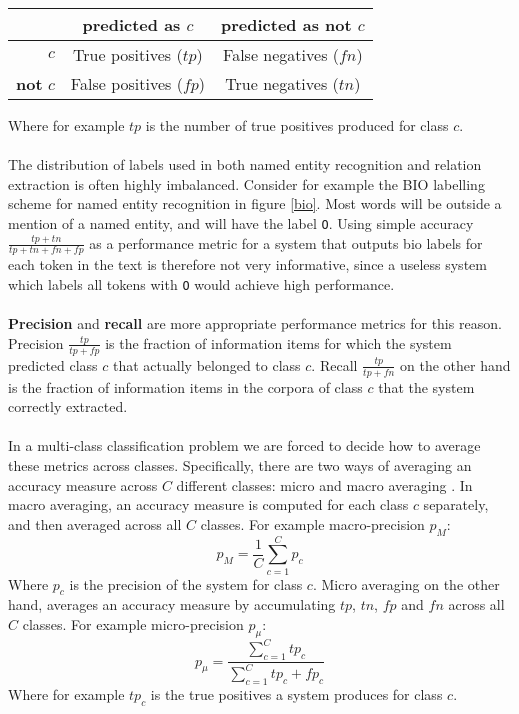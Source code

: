 \begin{center}
	\begin{tabular}{r | c c}
	 & \textbf{predicted as $c$} & \textbf{predicted as not $c$}  \\ \hline
	$c$ & True positives ($tp$) & False negatives ($fn$) \\
	\textbf{not} $c$ & False positives ($fp$) & True negatives ($tn$)
\end{tabular}
\end{center}
Where for example $tp$ is the number of true positives produced for class $c$.
\\\\
The distribution of labels used in both named entity recognition and relation extraction is often highly imbalanced. Consider for example the BIO labelling scheme for named entity recognition in figure \ref{bio}. Most words will be outside a mention of a named entity, and will have the label \texttt{O}. Using simple accuracy $\frac{tp + tn}{tp + tn + fn + fp}$ as a performance metric for a system that outputs bio labels for each token in the text is therefore not very informative, since a useless system which labels all tokens with \texttt{O} would achieve high performance.
\\\\
\textbf{Precision} and \textbf{recall} are more appropriate performance metrics for this reason. Precision $\frac{tp}{tp + fp}$ is the fraction of information items for which the system predicted class $c$ that actually belonged to class $c$.
Recall $\frac{tp}{tp + fn}$ on the other hand is the fraction of information items in the corpora of class $c$ that the system correctly extracted.
\\\\
In a multi-class classification problem we are forced to decide how to average these metrics across classes. Specifically, there are two ways of averaging an accuracy measure across $C$ different classes: micro and macro averaging \citep{sokolova2009}. In macro averaging, an accuracy measure is computed for each class $c$ separately, and then averaged across all $C$ classes. For example macro-precision $p_{M}$:
$$
p_{M} = \frac{1}{C}\sum_{c=1}^C p_c
$$
Where $p_c$ is the precision of the system for class $c$. Micro averaging on the other hand, averages an accuracy measure by accumulating $tp$, $tn$, $fp$ and $fn$ across all $C$ classes. For example micro-precision $p_{\mu}$:
$$
p_\mu = \frac{\sum\limits_{c=1}^C tp_c}{\sum\limits_{c=1}^C tp_c + fp_c}
$$
Where for example $tp_c$ is the true positives a system produces for class $c$.
